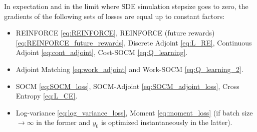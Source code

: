 \documentclass[]{fairmeta}
\begin{document}
\begin{theorem} \label{thm:main}
    In expectation and in the limit where SDE simulation stepsize goes to zero, the gradients of the following sets of losses are equal up to constant factors: 
    \begin{itemize}[leftmargin=0.5cm]
    \item REINFORCE \eqref{eq:REINFORCE}, REINFORCE (future rewards) \eqref{eq:REINFORCE_future_rewards}, Discrete Adjoint \eqref{eq:L_RE}, Continuous Adjoint \eqref{eq:cont_adjoint},
    Cost-SOCM
    \eqref{eq:Q_learning}.
    \item Adjoint Matching \eqref{eq:work_adjoint} and Work-SOCM \eqref{eq:Q_learning_2}.
    \item SOCM \eqref{eq:SOCM_loss}, SOCM-Adjoint \eqref{eq:SOCM_adjoint_loss}, Cross Entropy \eqref{eq:L_CE}.
    \item Log-variance \eqref{eq:log_variance_loss}, Moment \eqref{eq:moment_loss} (if batch size $\to \infty$ in the former and $y_0$ is optimized instantaneously in the latter).
    \end{itemize}
\end{theorem}

\end{document}
